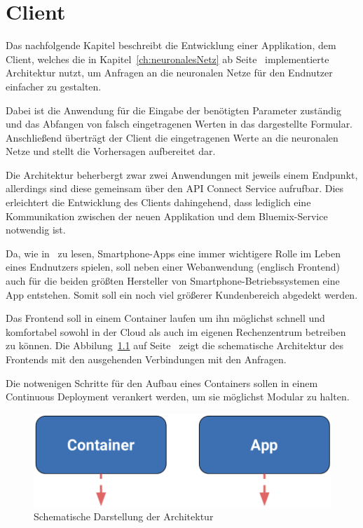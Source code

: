 \chapter{Client}
\label{ch:client}
Das nachfolgende Kapitel beschreibt die Entwicklung einer Applikation, dem Client, welches die in
Kapitel~\ref{ch:neuronalesNetz} ab Seite~\pageref{ch:neuronalesNetz} implementierte Architektur nutzt, um Anfragen an
die neuronalen Netze für den Endnutzer einfacher zu gestalten.

Dabei ist die Anwendung für die Eingabe der benötigten Parameter zuständig und das Abfangen von falsch eingetragenen
Werten in das dargestellte Formular. Anschließend überträgt der Client die eingetragenen Werte an die neuronalen Netze
und stellt die Vorhersagen aufbereitet dar.

Die Architektur beherbergt zwar zwei Anwendungen mit jeweils einem Endpunkt, allerdings sind diese gemeinsam über
den API Connect Service aufrufbar. Dies erleichtert die Entwicklung des Clients dahingehend, dass lediglich eine
Kommunikation zwischen der neuen Applikation und dem Bluemix-Service notwendig ist.

Da, wie in~\cite{online_client_apps} zu lesen, Smartphone-Apps eine immer wichtigere Rolle im Leben eines Endnutzers
spielen, soll neben einer Webanwendung (englisch Frontend) auch für die beiden größten Hersteller von
Smartphone-Betriebssystemen eine App entstehen. Somit soll ein noch viel größerer Kundenbereich abgedekt werden.

Das Frontend soll in einem Container laufen um ihn möglichst schnell und komfortabel sowohl in der Cloud als auch 
im eigenen Rechenzentrum betreiben zu können. Die Abbilung~\ref{fig:schematische_architektur_4} auf
Seite~\pageref{fig:schematische_architektur_4} zeigt die schematische Architektur des Frontends mit den ausgehenden
Verbindungen mit den Anfragen.

Die notwenigen Schritte für den Aufbau eines Containers sollen in einem Continuous Deployment verankert werden, um sie
möglichst Modular zu halten.

\begin{figure}[h]
    \centering
    \includegraphics[scale=0.5]{images/kapitel_4/architektur_schematisch.pdf}
    \caption{Schematische Darstellung der Architektur}
    \label{fig:schematische_architektur_4}
\end{figure}